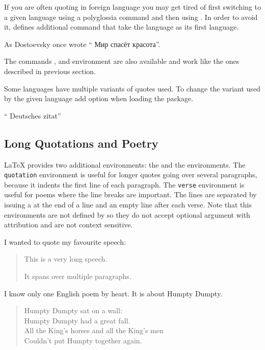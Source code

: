 If you are often quoting in foreign language you may get tired of first
switching to a given language using a polyglossia command and then using
. In order to avoid it,  defines additional
 command that take the language as its first language.
\begingroup
\setmonofont{cmuntt.otf}
\begin{example}
As Dostoevsky once wrote
\foreignquote{russian}{%
  Мир спасёт красота}.
\end{example}
\endgroup
The commands ,  and environment
 are also available and work like the ones
described in previous section.

Some languages have multiple variants of quotes used. To change the variant
used by the given language add option 
when loading the  package.
\begin{example}
\usepackage[
  autostyle,
  german=guillemets,
]{csquotes}

\foreignquote{german}{%
  Deutsches zitat}
\end{example}

\subsection{Long Quotations and Poetry}
\LaTeX{} provides two additional environments: the  and the
 environments. The \texttt{quotation} environment is useful for
longer quotes going over several paragraphs, because it indents the first line
of each paragraph. The \texttt{verse} environment is useful for poems where the
line breaks are important. The lines are separated by issuing a \csi{\bs} at the
end of a line and an empty line after each verse. Note that this environments
are not defined by  so they do not accept optional argument with
attribution and are not context sensitive.

\begin{example}
I wanted to quote my
favourite speech:
\begin{quotation}
  This is a very
  long speech.

  It spans over multiple
  paragraphs.
\end{quotation}
\end{example}

\begin{example}
I know only one English
poem by heart. It is
about Humpty Dumpty.
\begin{verse}
  Humpty Dumpty sat
  on a wall:\\
  Humpty Dumpty had
  a great fall.\\
  All the King's horses
  and all the King's men\\
  Couldn't put Humpty
  together again.
\end{verse}
\end{example}

